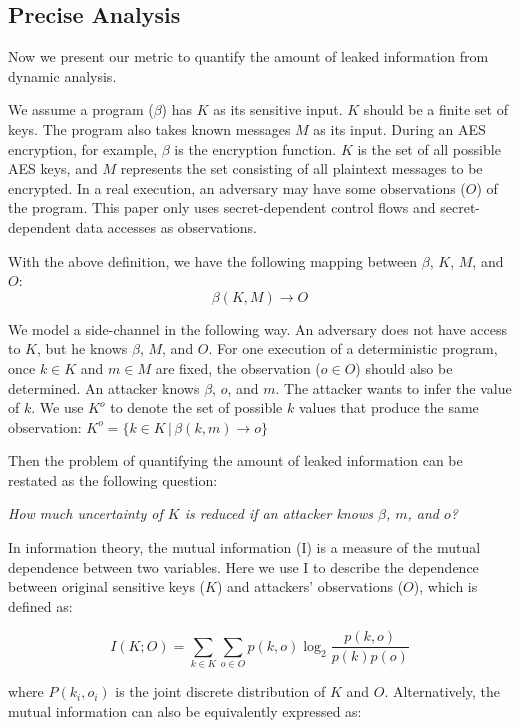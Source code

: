 \subsection{Precise Analysis}
Now we present our metric to quantify the amount of leaked information from
dynamic analysis.

We assume a program ($\beta$) has $K$ as its sensitive input. $K$ should be
a finite set of keys. The program also takes known messages $M$ as its input.
During an AES encryption, for example,
$\beta$ is the encryption function. $K$ is the set of all possible AES keys,
and $M$ represents the set consisting of all plaintext messages to be encrypted. In a real execution, an adversary may have
some observations ($O$) of the program. This paper only
uses secret-dependent control flows and secret-dependent data
accesses as observations.

With the above definition, we have the following mapping between $\beta$,
$K$, $M$, and $O$:
\begin{displaymath}
    \beta(K, M) \rightarrow O
\end{displaymath}


We model a side-channel in the following way. An adversary does not have
access to $K$, but he knows $\beta$, $M$, and $O$. For one execution of a
deterministic program, once $k \in K$ and $m \in M$ are fixed, the observation
($o \in O$) should also be determined. An attacker knows $\beta$, $o$,
and $m$. The attacker wants to infer the value of $k$. We use $K^o$ to denote
the set of possible $k$ values that produce the same observation: $K^o = \{ k \in K \, |\, \beta(k, m) \rightarrow o\}$

Then the problem of quantifying the amount of leaked information can be
restated as the following question:

\emph{How much uncertainty of $K$ is reduced if an attacker knows $\beta$, $m$, and $o$?}

In information theory, the mutual information (I) is a measure of the mutual
dependence between two variables. Here we use I to describe the
dependence between original sensitive keys ($K$) and attackers' observations ($O$),
which is defined as:

\begin{equation} \label{eq:1}
    I(K;O) = \sum_{k {\in} K}{\sum_{o {\in} O}{p(k, o)\log_2\frac{p(k, o)}{p(k)p(o)}}}
\end{equation}

where $P(k_i, o_i)$ is the joint discrete distribution of $K$ and $O$.
Alternatively, the mutual information can also be equivalently expressed as:

